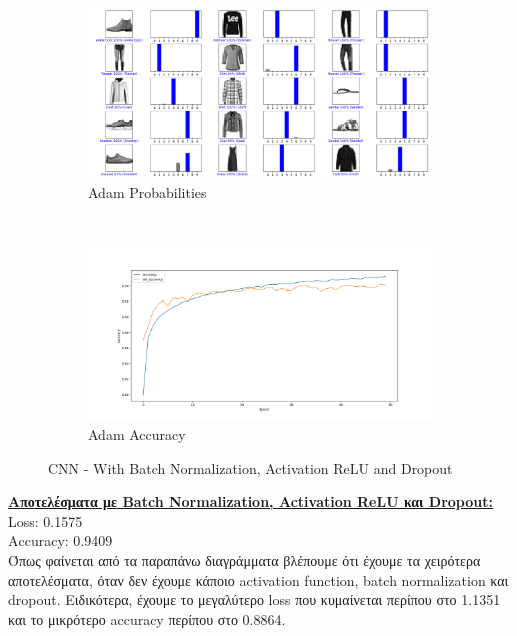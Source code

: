 \documentclass{article}
\begin{document}
	\pagebreak
	\begin{figure}[h!]
		\centering
		\begin{subfigure}[t]{0.5\textwidth}
			\centering
			\includegraphics[width=\linewidth]{../exercise3_3/images/fashion_cnn_probabilities.png}
			\caption{Adam Probabilities}
		\end{subfigure}%
		~
		\begin{subfigure}[t]{0.5\textwidth}
			\centering
			\includegraphics[width=\linewidth]{../exercise3_3/images/fashion_cnn_accuracy.png}
			\caption{Adam Accuracy}
		\end{subfigure}
		\caption{CNN - With Batch Normalization, Activation ReLU and Dropout}
	\end{figure}
	\noindent
	\textbf{\underline{Aποτελέσματα με Batch Normalization, Activation ReLU και Dropout:}}\\
	Loss: 0.1575 \\
	Αccuracy: 0.9409\\
	
	\noindent
	Όπως φαίνεται από τα παραπάνω διαγράμματα βλέπουμε ότι έχουμε τα χειρότερα αποτελέσματα, όταν δεν έχουμε κάποιο activation function, batch normalization και dropout. Ειδικότερα, έχουμε το μεγαλύτερο loss που κυμαίνεται περίπου στο 1.1351 και το μικρότερο accuracy περίπου στο 0.8864. \\
	
\end{document}
